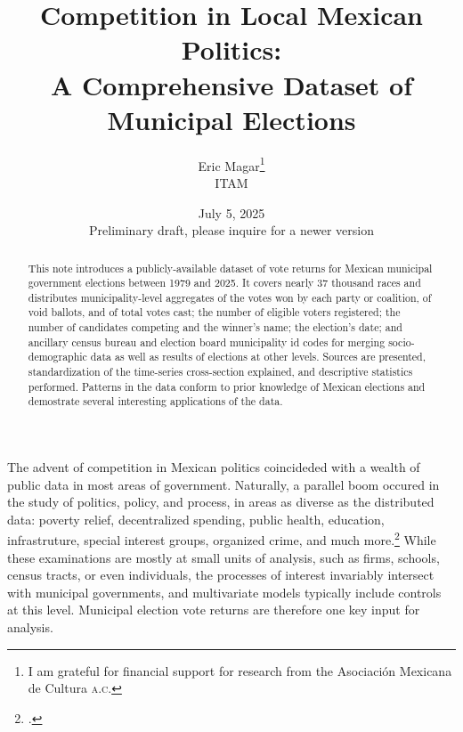 \documentclass[letter,12pt]{article}
\begin{document}
\title{Competition in Local Mexican Politics: \\ A Comprehensive Dataset of Municipal Elections}
\author{Eric Magar\footnote{I am grateful for financial support for research from the Asociaci\'on Mexicana de Cultura \textsc{a.c.}} \\ ITAM}
\date{July 5, 2025 \\ Preliminary draft, please inquire for a newer version}
\maketitle

\begin{abstract}
\noindent This note introduces a publicly-available dataset of vote returns for Mexican municipal government elections between 1979 and 2025. It covers nearly 37 thousand races and distributes municipality-level aggregates of the votes won by each party or coalition, of void ballots, and of total votes cast; the number of eligible voters registered; the number of candidates competing and the winner's name; the election's date; and ancillary census bureau and election board municipality id codes for merging socio-demographic data as well as results of elections at other levels. Sources are presented, standardization of the time-series cross-section explained, and descriptive statistics performed. Patterns in the data conform to prior knowledge of Mexican elections and demostrate several interesting applications of the data.
\end{abstract}

\noindent The advent of competition in Mexican politics coincideded with a wealth of public data in most areas of government. Naturally, a parallel boom occured in the study of politics, policy, and process, in areas as diverse as the distributed data: poverty relief, decentralized spending, public health, education, infrastruture, special interest groups, organized crime, and much more.\footnote{ \citep[See][]{diaz-estevez-magaloni-Poverty-book.2016, delao.cctransfers.2013, cantuGroceries2019, hernandez.jaramillo.FiscalDescentralMx2008wd, king.etal.segPop.2007, frenk.2006, behrman.etal.Prospera2025qe, avitabile.dehoyos.2018, garfias.etal.Infrastructure2021, palmer.rubin.Patronage2019cps, dube.garcia.ponce-MaizeDrugs2016jeea, dell.DrugWar.2015aer, timmons.broid.2013}.} While these examinations are mostly at small units of analysis, such as firms, schools, census tracts, or even individuals, the processes of interest invariably intersect with municipal governments, and multivariate models typically include controls at this level. Municipal election vote returns are therefore one key input for analysis. 
\end{document}
